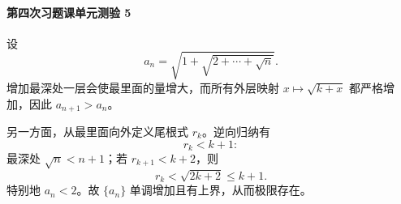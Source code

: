 \paragraph{第四次习题课单元测验 5}
\begin{xsolution}
设
\[
  a_n=\sqrt{1+\sqrt{2+\cdots+\sqrt n}}.
\]
增加最深处一层会使最里面的量增大，而所有外层映射 $x\mapsto\sqrt{k+x}$ 都严格增加，因此 $a_{n+1}>a_n$。

另一方面，从最里面向外定义尾根式 $r_k$。逆向归纳有
\[
  r_k<k+1:
\]
最深处 $\sqrt n<n+1$；若 $r_{k+1}<k+2$，则
\[
  r_k<\sqrt{2k+2}\le k+1.
\]
特别地 $a_n<2$。故 $\{a_n\}$ 单调增加且有上界，从而极限存在。
\end{xsolution}
